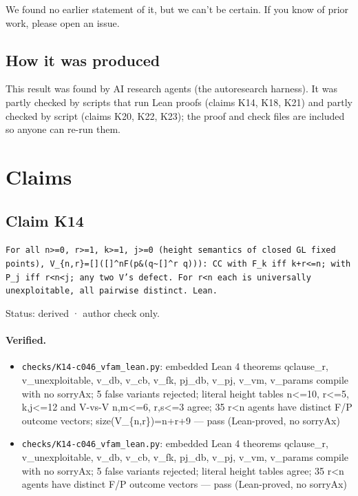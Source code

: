 \documentclass{article}
\begin{document}
We found no earlier statement of it, but we can't be certain. If you know of prior work, please open an issue.

\subsection*{How it was produced}

This result was found by AI research agents (the autoresearch harness). It was partly checked by scripts that run Lean proofs (claims K14, K18, K21) and partly checked by script (claims K20, K22, K23); the proof and check files are included so anyone can re-run them.

\section{Claims}

\subsection*{Claim K14}

\texttt{For all n\textgreater{}=0, r\textgreater{}=1, k\textgreater{}=1, j\textgreater{}=0 (height semantics of closed GL fixed points), V\_\{n,r\}=[]([]\textasciicircum{}nF\textbar{}(p\&(q\textbar{}\textasciitilde{}[]\textasciicircum{}r q))): CC with F\_k iff k+r\textless{}=n; with P\_j iff r\textless{}n\textless{}j; any two V's defect. For r\textless{}n each is universally unexploitable, all pairwise distinct. Lean.}

Status: derived · author check only.

\paragraph{Verified.}
\begin{itemize}
\item \texttt{checks/K14-c046\_vfam\_lean.py}: embedded Lean 4 theorems qclause\_r, v\_unexploitable, v\_db, v\_cb, v\_fk, pj\_db, v\_pj, v\_vm, v\_params compile with no sorryAx; 5 false variants rejected; literal height tables n\textless{}=10, r\textless{}=5, k,j\textless{}=12 and V-vs-V n,m\textless{}=6, r,s\textless{}=3 agree; 35 r\textless{}n agents have distinct F/P outcome vectors; size(V\_\{n,r\})=n+r+9 --- pass (Lean-proved, no sorryAx)
\item \texttt{checks/K14-c046\_vfam\_lean.py}: embedded Lean 4 theorems qclause\_r, v\_unexploitable, v\_db, v\_cb, v\_fk, pj\_db, v\_pj, v\_vm, v\_params compile with no sorryAx; 5 false variants rejected; literal height tables agree; 35 r\textless{}n agents have distinct F/P outcome vectors --- pass (Lean-proved, no sorryAx)
\end{itemize}
\end{document}

